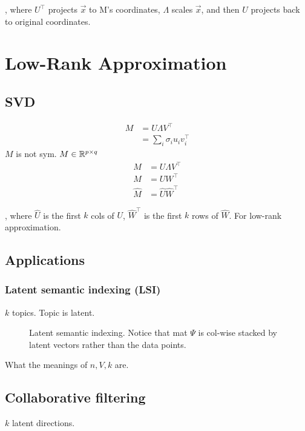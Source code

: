 \documentclass[a4paper]{report}
\begin{document}
, where $U^\top$ projects $\vec x$ to M's coordinates, $\Lambda$ scales $\vec x$, and then  $U$ projects back to original coordinates.
\section{Low-Rank Approximation}
\subsection{SVD}
\begin{align*}
M &= U\Lambda V^\top  \\
&= \sum_i \sigma_i u_i v_i^\top
\end{align*}
$M$ is not sym. $M\in \mathbb{R}^{p\times q}$
\begin{align*}
M &= U \Lambda V^\top \\
M &=UW^\top \\
\hat M &=\hat U \hat W^\top
\end{align*}

, where $\hat U$ is the first $k$ cols of $U$, $\hat W^\top$ is the first $k$ rows of $\hat W$. For low-rank approximation. 

\subsection{Applications}
\subsubsection{Latent semantic indexing (LSI)}
$k$ topics. Topic is latent.

\begin{figure}[!htp]
\centering
{}
\caption{Latent semantic indexing. Notice that mat $\Psi$ is col-wise stacked by latent vectors rather than the data points. }
\label{fig:lsi}
\end{figure}

What the meanings of $n, V, k$ are.
\subsection{Collaborative filtering}
$k$ latent directions. 
\end{document}
